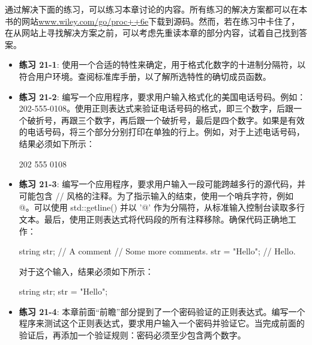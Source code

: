通过解决下面的练习，可以练习本章讨论的内容。所有练习的解决方案都可以在本书的网站\url{www.wiley.com/go/proc++6e}下载到源码。然而，若在练习中卡住了，在从网站上寻找解决方案之前，可以考虑先重读本章的部分内容，试着自己找到答案。

\begin{itemize}
\item
\textbf{练习 21-1}: 使用一个合适的特性来确定，用于格式化数字的十进制分隔符，以符合用户环境。查阅标准库手册，以了解所选特性的确切成员函数。

\item
\textbf{练习 21-2}: 编写一个应用程序，要求用户输入格式化的美国电话号码。例如：202-555-0108。使用正则表达式来验证电话号码的格式，即三个数字，后跟一个破折号，再跟三个数字，再后跟一个破折号，最后是四个数字。如果是有效的电话号码，将三个部分分别打印在单独的行上。例如，对于上述电话号码，结果必须如下所示：

\begin{shell}
202
555
0108
\end{shell}

\item
\textbf{练习 21-3}: 编写一个应用程序，要求用户输入一段可能跨越多行的源代码，并可能包含 // 风格的注释。为了指示输入的结束，使用一个哨兵字符，例如 @。可以使用 std::getline() 并以 '@' 作为分隔符，从标准输入控制台读取多行文本。最后，使用正则表达式将代码段的所有注释移除。确保代码正确地工作：

\begin{cpp}
string str; // A comment // Some more comments.
str = "Hello"; // Hello.
\end{cpp}

对于这个输入，结果必须如下所示：

\begin{shell}
string str;
str = "Hello";
\end{shell}

\item
\textbf{练习 21-4}: 本章前面“前瞻”部分提到了一个密码验证的正则表达式。编写一个程序来测试这个正则表达式，要求用户输入一个密码并验证它。当完成前面的验证后，再添加一个验证规则：密码必须至少包含两个数字。
\end{itemize}